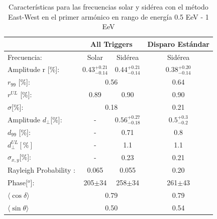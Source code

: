 \documentclass[11pt, letterpaper,oneside]{article}
\begin{document}
\begin{table}[H]
    \begin{small}
        \begin{center}
            \begin{tabular}[c]{l|c|c||c|}
\cline{2-4}                                       & \multicolumn{2}{c||}{All Triggers}    & \multicolumn{1}{c|}{Disparo Estándar}   \\ \hline
\multicolumn{1}{|l|}{Frecuencia:                } & Solar	                & Sidérea	                & Sidérea \cite{Aab_2020}   \\ \hline
\multicolumn{1}{|l|}{Amplitude r [\%]:           } & $0.43^{+0.21}_{-0.14}$	& $0.44^{+0.21}_{-0.14}$ 	& $0.38^{+0.20}_{-0.14}$ \cite{codigo}      \\
\multicolumn{1}{|l|}{$r_{99}$ [\%]:             } & \multicolumn{2}{c||}{0.56}                          & 0.64\cite{codigo}                 \\
\multicolumn{1}{|l|}{$r^{UL}$ [\%]:             } & 0.89 	                & 0.90                      & 0.90 \cite{codigo}                 \\ 
\multicolumn{1}{|l|}{$\sigma$[\%]:              } & \multicolumn{2}{c||}{0.18}                          & 0.21 \cite{codigo}      \\\hline
\multicolumn{1}{|l|}{Amplitude $d_\perp$[\%]:    } & -	                    & $0.56^{+0.27}_{-0.18}$ 	& $0.5^{+0.3}_{-0.2}$       \\
\multicolumn{1}{|l|}{$d_{99}$ [\%]:             } & - 	                    & 0.71                      & 0.8   \cite{codigo}                \\
\multicolumn{1}{|l|}{$d_{\perp}^{UL}[\%]$       } & -                       & 1.1                       & 1.1                         \\
\multicolumn{1}{|l|}{$\sigma_{x,y}$[\%]:        } & -	                    & 0.23	                    & 0.21       \\\hline
\multicolumn{1}{|l|}{Rayleigh Probability      :        } & 0.065                   & 0.055	                    & 0.20       \\
\multicolumn{1}{|l|}{Phase[$^o$]:                } & 205$\pm$34              & 258$\pm$34                & 261$\pm$43\\ \hline
\multicolumn{1}{|l|}{$\langle\cos\delta \rangle$} & \multicolumn{2}{c||}{0.79}        	                & 0.79 \cite{codigo}        \\        
\multicolumn{1}{|l|}{$\langle\sin\theta \rangle$} & \multicolumn{2}{c||}{0.50}        	                & 0.54\cite{codigo}        \\ \hline       
            \end{tabular}
        \end{center}
    \end{small}
    \caption{Características para las frecuencias solar y sidérea con el método East-West en el primer armónico en rango de energía 0.5 EeV - 1 EeV}
    \label{tab:segundo_bin_data}
\end{table}
\end{document}

